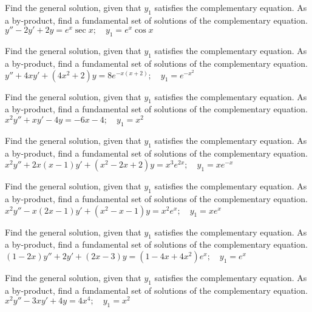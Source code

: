 \documentclass{ximera}
\begin{document}
\begin{problem}\label{exer:5.6.7}
Find the general solution,
given that $y_1$ satisfies the complementary equation. As a by-product,
find a fundamental set of solutions of the complementary equation. $y''-2y'+2y=e^x\sec x;   \quad y_1=e^x\cos x$
\end{problem}

\begin{problem}\label{exer:5.6.8}
Find the general solution,
given that $y_1$ satisfies the complementary equation. As a by-product,
find a fundamental set of solutions of the complementary equation. $y''+4xy'+(4x^2+2)y=8e^{-x(x+2)};   \quad y_1=e^{-x^2}$
\end{problem}

\begin{problem}\label{exer:5.6.9}
Find the general solution,
given that $y_1$ satisfies the complementary equation. As a by-product,
find a fundamental set of solutions of the complementary equation. $x^2y''+xy'-4y=-6x-4;  \quad y_1=x^2$
\end{problem}

\begin{problem}\label{exer:5.6.10}
Find the general solution,
given that $y_1$ satisfies the complementary equation. As a by-product,
find a fundamental set of solutions of the complementary equation. $x^2y''+2x(x-1)y'+(x^2-2x+2)y=x^3e^{2x};   \quad y_1=xe^{-x}$
\end{problem}

\begin{problem}\label{exer:5.6.11}
Find the general solution,
given that $y_1$ satisfies the complementary equation. As a by-product,
find a fundamental set of solutions of the complementary equation. $x^2y''-x(2x-1)y'+(x^2-x-1)y=x^2e^x;  \quad y_1=xe^x$
\end{problem}

\begin{problem}\label{exer:5.6.12}
Find the general solution,
given that $y_1$ satisfies the complementary equation. As a by-product,
find a fundamental set of solutions of the complementary equation. $(1-2x)y''+2y'+(2x-3)y=(1-4x+4x^2)e^x;  \quad y_1=e^x$
\end{problem}

\begin{problem}\label{exer:5.6.13}
Find the general solution,
given that $y_1$ satisfies the complementary equation. As a by-product,
find a fundamental set of solutions of the complementary equation. $x^2y''-3xy'+4y=4x^4;  \quad y_1=x^2$
\end{problem}
\end{document}

